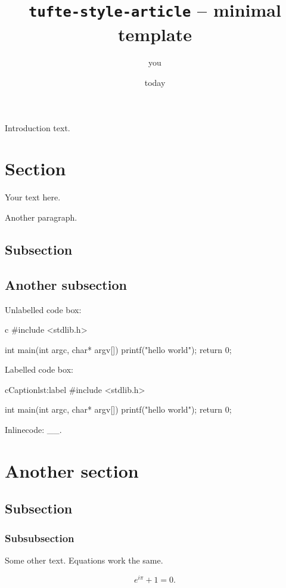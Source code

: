 \documentclass[
]{tufte-style-article}
\title{\texttt{tufte-style-article} -- minimal template}
\author{you}
\date{today}
\begin{document}
\maketitle

Introduction text.


\section{Section}

Your text here.

Another paragraph.

\subsection{Subsection}



\newpage
{}

\subsection{Another subsection}

Unlabelled code box:

\begin{codebox}{c}
#include <stdlib.h>

int main(int argc, char* argv[]) {
    printf("hello world");
    return 0;
}
\end{codebox}

Labelled code box:

\begin{snippet}{c}{Caption}{lst:label}
#include <stdlib.h>

int main(int argc, char* argv[]) {
    printf("hello world");
    return 0;
}
\end{snippet}

Inlinecode: __.


\section{Another section}


\subsection{Subsection}


\subsubsection{Subsubsection}

Some other text. Equations work the same.

$$
e^{i\pi}+1 = 0.
$$
\end{document}
